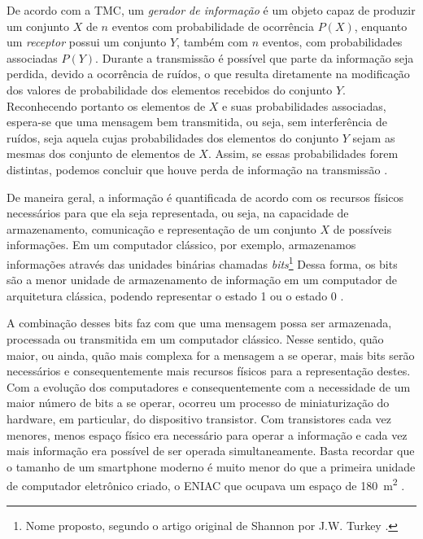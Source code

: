 \documentclass[12pt,oneside,brazil,hidelinks,article,sumario=tradicional,a4paper]{abntex2}
\begin{document}
De acordo com  a TMC, um \textit{gerador de informação} é um objeto capaz de produzir um conjunto $X$ de $n$ eventos com probabilidade de ocorrência $P(X)$, enquanto um \textit{receptor} possui um conjunto $Y$, também com $n$ eventos, com probabilidades associadas $P(Y)$. Durante a transmissão é possível que parte da informação seja perdida, devido a ocorrência de ruídos, o que resulta diretamente na modificação dos valores de probabilidade dos elementos recebidos do conjunto $Y$. Reconhecendo portanto os elementos de $X$ e suas probabilidades associadas, espera-se que uma mensagem bem transmitida, ou seja, sem interferência de ruídos, seja aquela cujas probabilidades dos elementos do conjunto $Y$ sejam as mesmas dos conjunto de elementos de $X$. Assim, se essas probabilidades forem distintas, podemos concluir que houve perda de informação na transmissão \cite{mathematical}.

De maneira geral, a informação é quantificada de acordo com os recursos físicos necessários para que ela seja representada, ou seja, na capacidade de armazenamento, comunicação e representação de um conjunto $X$ de possíveis informações. Em um computador clássico, por exemplo, armazenamos informações através das unidades binárias chamadas \textit{bits}\footnote{Nome proposto, segundo o artigo original de Shannon por J.W. Turkey \cite{MTC}.} Dessa forma, os bits são a menor unidade de armazenamento de informação em um computador de arquitetura clássica, podendo representar o estado 1 ou o estado 0 \cite{MTC}.

A combinação desses bits faz com que uma mensagem possa ser armazenada, processada ou transmitida em um computador clássico. Nesse sentido, quão maior, ou ainda, quão mais complexa for a mensagem a se operar, mais bits serão necessários e consequentemente mais recursos físicos para a representação destes. Com a evolução dos computadores e consequentemente com a necessidade de um maior número de bits a se operar, ocorreu um processo de miniaturização do hardware, em particular, do dispositivo transistor. Com transistores cada vez menores, menos espaço físico era necessário para operar a informação e cada vez mais informação era possível de ser operada simultaneamente. Basta recordar que o tamanho de um smartphone moderno é muito menor do que a primeira unidade de computador eletrônico criado, o ENIAC que ocupava um espaço de \SI{180}{\square\meter} \cite{eniac}.
\end{document}
